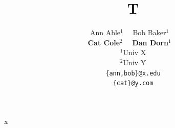 \documentclass{article}
\begin{document}
\title{T}
\author{Ann Able$^1$~~
  Bob Baker$^1$~~\\
  \textbf{Cat Cole}$^2$~~
  \textbf{Dan Dorn}$^1$~~\\
  $^1$Univ X\\
  $^2$Univ Y \\
  \texttt{\{ann,bob\}@x.edu}\\
  \texttt{\{cat\}@y.com}}
\maketitle
x
\end{document}
